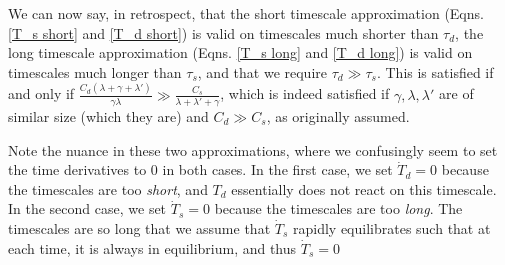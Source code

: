 We can now say, in retrospect, that the short timescale approximation (Eqns. \ref{T_s short} and \ref{T_d short}) is valid on timescales much shorter than $\tau_d$, the long timescale approximation (Eqns. \ref{T_s long} and \ref{T_d long}) is valid on timescales much longer than $\tau_s$, and that we require $\tau_d\gg \tau_s$. This is satisfied if and only if $\frac{C_d(\lambda+\gamma+\lambda')}{\gamma\lambda}\gg\frac{C_s}{\lambda+\lambda'+\gamma}$, which is indeed satisfied if $\gamma,\lambda,\lambda'$ are of similar size (which they are) and $C_d\gg C_s$, as originally assumed.

Note the nuance in these two approximations, where we confusingly seem to set the time derivatives to $0$ in both cases. In the first case, we set $\dot T_d=0$ because the timescales are too \textit{short}, and $T_d$ essentially does not react on this timescale. In the second case, we set $\dot T_s=0$ because the timescales are too \textit{long}. The timescales are so long that we assume that $\dot T_s$ rapidly equilibrates such that at each time, it is always in equilibrium, and thus $\dot T_s=0$


